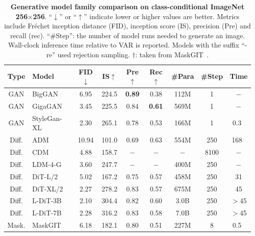 \begin{table}[!th]
\renewcommand\arraystretch{1.05}
\centering
\setlength{\tabcolsep}{2.5mm}{}
\small
{
\caption{\smallcaption
\textbf{Generative model family comparison on class-conditional ImageNet 256$\times$256}.
``$\downarrow$'' or ``$\uparrow$'' indicate lower or higher values are better.
Metrics include Fréchet inception distance (FID), inception score (IS), precision (Pre) and recall (rec).
``\#Step'': the number of model runs needed to generate an image.
Wall-clock inference time relative to VAR is reported.
Models with the suffix ``-re'' used rejection sampling.
$\dag$: taken from MaskGIT~\cite{maskgit}.
}\label{tab:main}
\vspace{-2pt}
\scalebox{0.98}
{
\begin{tabular}{c|l|cc|cc|cc|c}
\toprule
Type & Model          & FID$\downarrow$ & IS$\uparrow$ & Pre$\uparrow$ & Rec$\uparrow$ & \#Para & \#Step & Time \\
\midrule
GAN   & BigGAN~\cite{biggan}  & 6.95  & 224.5       & \textbf{0.89} & 0.38 & 112M & 1    & $-$    \\
GAN   & GigaGAN~\cite{gigagan}     & 3.45  & 225.5       & 0.84 & \textbf{0.61} & 569M & 1    & $-$ \\
GAN   & StyleGan-XL~\cite{stylegan-xl}  & 2.30  & 265.1       & 0.78 & 0.53 & 166M & 1    & 0.3~\cite{stylegan-xl}   \\
\midrule
Diff. & ADM~\cite{adm}         & 10.94 & 101.0        & 0.69 & 0.63 & 554M & 250  & 168~\cite{stylegan-xl}   \\
Diff. & CDM~\cite{cdm}         & 4.88  & 158.7       & $-$  & $-$  & $-$  & 8100 & $-$    \\
Diff. & LDM-4-G~\cite{ldm}     & 3.60  & 247.7       & $-$  & $-$  & 400M & 250  & $-$    \\
Diff. & DiT-L/2~\cite{dit}     & 5.02  & 167.2       & 0.75 & 0.57 & 458M & 250  & 31     \\
Diff. & DiT-XL/2~\cite{dit}    & 2.27  & 278.2       & 0.83 & 0.57 & 675M & 250  & 45     \\
Diff. & L-DiT-3B~\cite{dit-github}    & 2.10  & 304.4       & 0.82 & 0.60 & 3.0B & 250  & $>$45     \\
Diff. & L-DiT-7B~\cite{dit-github}    & 2.28  & 316.2       & 0.83 & 0.58 & 7.0B & 250  & $>$45     \\
\midrule
Mask. & MaskGIT~\cite{maskgit}     & 6.18  & 182.1        & 0.80 & 0.51 & 227M & 8    & 0.5~\cite{maskgit}  \\

\end{tabular}}}
\end{table}
